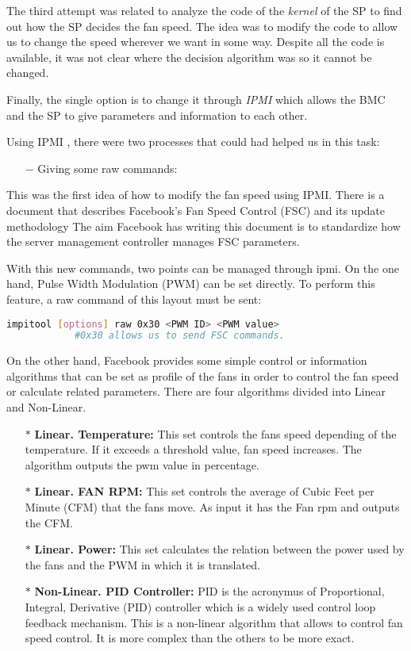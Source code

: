 The third attempt was related to analyze the code of the \emph{kernel} of the SP to find out how the SP decides the fan speed. The idea was to modify the code to allow us to change the speed wherever we want in some way. Despite all the code is available, it was not clear where the decision algorithm was so it cannot be changed.

Finally, the single option is to change it through \emph{IPMI} which allows the BMC and the SP to give parameters and information to each other.

Using IPMI \cite{serverConfigIPMI}, there were two processes that could had helped us in this task:

\begin{itemize}
    \item[$-$] Giving some raw commands:
\end{itemize}

This was the first idea of how to modify the fan speed using IPMI. There is a document that describes Facebook's Fan Speed Control (FSC) and its update methodology
The aim Facebook has writing this document is to standardize how the server management controller manages FSC parameters.

With this new commands, two points can be managed through ipmi. On the one hand, Pulse Width Modulation (PWM) can be set directly. To perform this feature, a raw command of this layout must be sent: 

\begin{lstlisting}[language=Bash]
impitool [options] raw 0x30 <PWM ID> <PWM value> 
            #0x30 allows us to send FSC commands.
\end{lstlisting}

On the other hand, Facebook provides some simple control or information algorithms that can be set as profile of the fans in order to control the fan speed or calculate related parameters. There are four algorithms divided into Linear and Non-Linear.

\begin{itemize}
    \item[$*$] \textbf{Linear. Temperature: }This set controls the fans speed depending of the temperature. If it exceeds a threshold value, fan speed increases. The algorithm outputs the pwm value in percentage.
    \item[$*$] \textbf{Linear. FAN RPM: }This set controls the average of Cubic Feet per Minute (CFM) that the fans move. As input it has the Fan rpm and outputs the CFM.
    \item[$*$] \textbf{Linear. Power: }This set calculates the relation between the power used by the fans and the PWM in which it is translated.
     \item[$*$] \textbf{Non-Linear. PID Controller: }PID is the acronymus of Proportional, Integral, Derivative (PID) controller which is a widely used control loop feedback mechanism. This is a non-linear algorithm that allows to control fan speed control. It is more complex than the others to be more exact.
\end{itemize}

